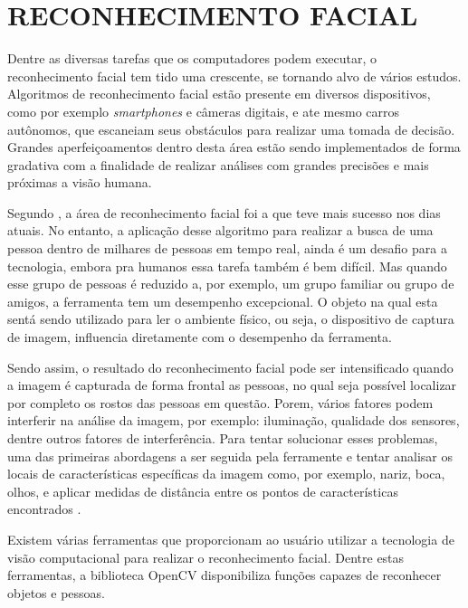 \section{{RECONHECIMENTO FACIAL}}

Dentre as diversas tarefas que os computadores podem executar, o reconhecimento facial tem tido uma crescente, se tornando alvo de vários estudos. Algoritmos de reconhecimento facial estão presente em diversos dispositivos, como por exemplo \textit{smartphones} e câmeras digitais, e ate mesmo carros autônomos, que escaneiam seus obstáculos para realizar uma tomada de decisão. Grandes aperfeiçoamentos dentro desta área estão sendo implementados de forma gradativa com a finalidade de realizar análises com grandes precisões e mais próximas a visão humana.

Segundo , a área de reconhecimento facial foi a que teve mais sucesso nos dias atuais. No entanto, a aplicação desse algoritmo para realizar a busca de uma pessoa dentro de milhares de pessoas em tempo real, ainda é um desafio para a tecnologia, embora pra humanos essa tarefa também é bem difícil. Mas quando esse grupo de pessoas é reduzido a, por exemplo, um grupo familiar ou grupo de amigos, a ferramenta tem um desempenho excepcional. O objeto na qual esta sentá sendo utilizado para ler o ambiente físico, ou seja, o dispositivo de captura de imagem, influencia diretamente com o desempenho da ferramenta.

Sendo assim, o resultado do reconhecimento facial pode ser intensificado quando a imagem é capturada de forma frontal as pessoas, no qual seja possível localizar por completo os rostos das pessoas em questão. Porem, vários fatores podem interferir na análise da imagem, por exemplo: iluminação, qualidade dos sensores, dentre outros fatores de interferência. Para tentar solucionar esses problemas, uma das primeiras abordagens a ser seguida pela ferramente e tentar analisar os locais de características específicas da imagem como, por exemplo, nariz, boca, olhos, e aplicar medidas de distância entre os pontos de características encontrados \cite{SZELISKI2010}.

Existem várias ferramentas que proporcionam ao usuário utilizar a tecnologia de visão computacional para realizar o reconhecimento facial. Dentre estas ferramentas, a biblioteca OpenCV disponibiliza funções capazes de reconhecer objetos e pessoas. 